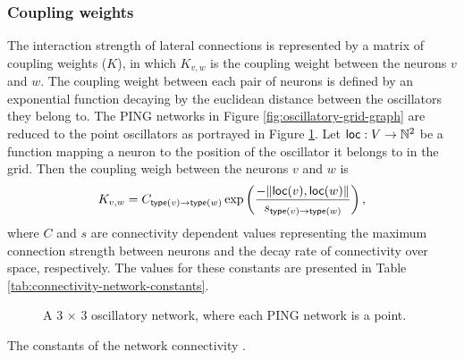 \subsubsection{Coupling weights}
\label{sec:coupling-weights}

The interaction strength of lateral connections is represented by a matrix of coupling weights ($K$), in which $K_{v, w}$ is the coupling weight between the neurons $v$ and $w$. 
The coupling weight between each pair of neurons is defined by an exponential function decaying by the euclidean distance between the oscillators they belong to. The PING networks in Figure \ref{fig:oscillatory-grid-graph} are reduced to the point oscillators as portrayed in Figure \ref{fig:oscillatory-point-grid}. 
Let $\mathsf{loc}: V \to \mathbb{N}^2$ be a function mapping a neuron to the position of the oscillator it belongs to in the grid. Then the coupling weigh between the neurons $v$ and $w$ is
\begin{equation}
    K_{v, w} = C_{\mathsf{type}(v) \to \mathsf{type}(w)} \exp \left( \frac{-\| \mathsf{loc}(v), \mathsf{loc}(w) \|}{s_{\mathsf{type}(v) \to \mathsf{type}(w)}} \right),
    \label{eq:coupling-weights}
\end{equation}
where $C$ and $s$ are connectivity dependent values representing the maximum connection strength between neurons and the decay rate of connectivity over space, respectively. The values for these constants are presented in Table \ref{tab:connectivity-network-constants}.

\begin{figure}[!htp]
    \centering
    
    \caption{A 3 $\times$ 3 oscillatory network, where each PING network is a point.}
    \label{fig:oscillatory-point-grid}
\end{figure}

\begin{table}[!htp] 
    \centering
    
    \caption{The constants of the network connectivity \cite{Lowet2015}.}
    \label{tab:connectivity-network-constants}
\end{table}